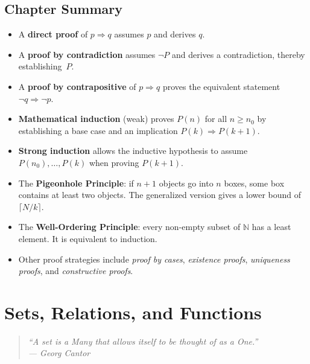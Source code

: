 \documentclass[12pt,a4paper,openany]{book}
\theoremstyle{definition}
\theoremstyle{plain}
\theoremstyle{remark}
\newcommand{\N}{\mathbb{N}}
\begin{document}
\section{Chapter Summary}
\label{sec:summary-ch2}

\begin{itemize}[nosep]
  \item A \textbf{direct proof} of $p \Rightarrow q$ assumes $p$ and derives $q$.
  \item A \textbf{proof by contradiction} assumes $\lnot P$ and derives a
        contradiction, thereby establishing~$P$.
  \item A \textbf{proof by contrapositive} of $p \Rightarrow q$ proves the equivalent
        statement $\lnot q \Rightarrow \lnot p$.
  \item \textbf{Mathematical induction} (weak) proves $P(n)$ for all $n \geq n_0$ by
        establishing a base case and an implication $P(k) \Rightarrow P(k+1)$.
  \item \textbf{Strong induction} allows the inductive hypothesis to assume
        $P(n_0), \dots, P(k)$ when proving $P(k+1)$.
  \item The \textbf{Pigeonhole Principle}: if $n+1$ objects go into $n$ boxes, some
        box contains at least two objects. The generalized version gives a lower bound
        of $\lceil N/k \rceil$.
  \item The \textbf{Well-Ordering Principle}: every non-empty subset of $\N$ has a
        least element. It is equivalent to induction.
  \item Other proof strategies include \emph{proof by cases}, \emph{existence proofs},
        \emph{uniqueness proofs}, and \emph{constructive proofs}.
\end{itemize}


\chapter{Sets, Relations, and Functions}
\label{ch:sets-relations-functions}

\begin{quote}
\itshape
``A set is a Many that allows itself to be thought of as a One.''\\
--- Georg Cantor
\end{quote}
\end{document}
